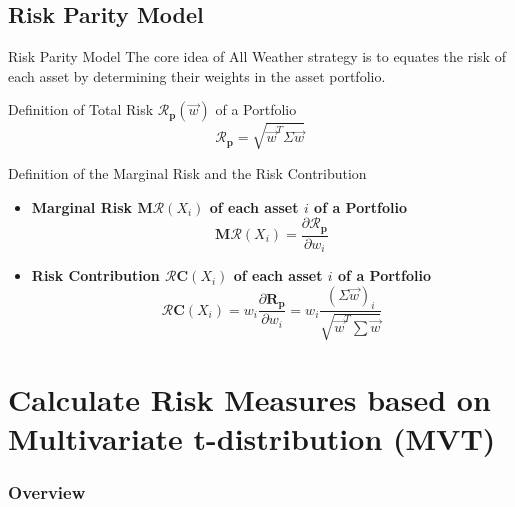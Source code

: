 \documentclass{beamer}
\begin{document}
\subsection{Risk Parity Model}

\begin{frame}{Risk Parity Model}
The core idea of All Weather strategy is to equates the risk of each asset by determining their weights in the asset portfolio.

\begin{block}{Definition of Total Risk $\boldsymbol{\mathcal{R}}_\mathbf{p}(\vec{w})$ of a Portfolio}
 \begin{equation*}
\boldsymbol{\mathcal{R}}_{\mathbf{p}}=\sqrt{\vec{w}^T \Sigma \vec{w}}
 \end{equation*}
\end{block}

\begin{block}{Definition of the Marginal Risk and the Risk Contribution}

\begin{itemize}
    \item \textbf{Marginal Risk $\boldsymbol{M}\boldsymbol{\mathcal{R}}(X_{i})$ of each asset $i$ of a Portfolio}\begin{equation*}\boldsymbol{M}\boldsymbol{\mathcal{R}}\left(X_i\right)=\frac{\partial \boldsymbol{\mathcal{R}}_{\mathbf{p}}}{\partial w_i}
    \end{equation*}
    \item \textbf{Risk Contribution $\boldsymbol{\mathcal{R}}\boldsymbol{C}(X_i)$ of each asset $i$ of a Portfolio}\begin{equation*}
    \boldsymbol{\mathcal{R}}\boldsymbol{C}\left(X_i\right) =w_i \frac{\partial \boldsymbol{R}_\mathbf{p}}{\partial w_i}=w_i \frac{(\Sigma \vec{w})_i}{\sqrt{\vec{w}^T \sum \vec{w}}} 
    \end{equation*}
 
 \end{itemize}

\end{block}

\end{frame}

\section{Calculate Risk Measures based on Multivariate
t-distribution (MVT)}
\begin{frame}
\frametitle{Overview} %
\tableofcontents[currentsection] %
\end{frame}
\end{document}

